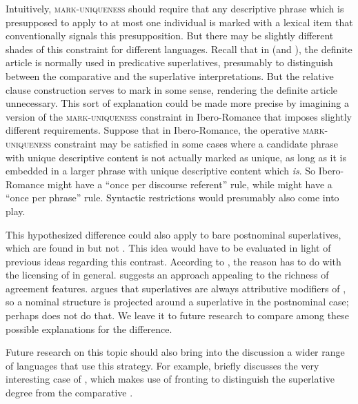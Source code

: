 \documentclass[output=paper
,modfonts
,nonflat]{langsci/langscibook}
\begin{document}
Intuitively, \textsc{mark-uniqueness} should require that any descriptive phrase which is presupposed to apply to at most one individual is marked with a lexical item that conventionally signals this presupposition. But there may be slightly different shades of this constraint for different languages. Recall that in  (and ), the definite article is normally used in predicative superlatives, presumably to distinguish between the comparative and the superlative interpretations. But the relative clause construction serves to mark  in some sense, rendering the definite article unnecessary. This sort of explanation could be made more precise by imagining a version of the \textsc{mark-uniqueness} constraint in Ibero-Romance that imposes slightly different requirements. Suppose that in Ibero-Romance, the operative \textsc{mark-uniqueness} constraint may be satisfied in some cases where a candidate phrase with unique descriptive content is not actually marked as unique, as long as it is embedded in a larger phrase with unique descriptive content which \textit{is}. So Ibero-Romance might have a ``once per discourse referent'' rule, while  might have a ``once per phrase'' rule. Syntactic restrictions would presumably also come into play.

This hypothesized difference could also apply to bare postnominal superlatives, which are found in  but not . This idea would have to be evaluated in light of previous ideas regarding this contrast. According to \citet{Kayne2008}, the reason has to do with the licensing of  in general. \citet[74--75]{Alexiadou2014} suggests an approach appealing to the richness of agreement features. \citet{Matushansky2008} argues that superlatives are always attributive modifiers of , so a nominal structure is projected around a superlative in the postnominal case; perhaps  does not do that. We leave it to future research to compare among these possible explanations for the difference.

Future research on this topic should also bring into the discussion a wider range of languages that use this strategy.  For example, \citet{Plank2003} briefly discusses the very interesting case of , which makes use of fronting to distinguish the superlative degree  from the comparative .
\end{document}
